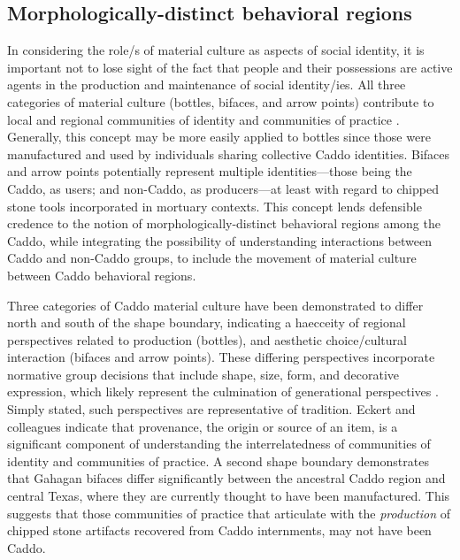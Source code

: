 \documentclass[smallextended]{svjour3}       %
\begin{document}
\hypertarget{morphologically-distinct-behavioral-regions}{%
\subsection{Morphologically-distinct behavioral
regions}\label{morphologically-distinct-behavioral-regions}}

In considering the role/s of material culture as aspects of social
identity, it is important not to lose sight of the fact that people and
their possessions are active agents in the production and maintenance of
social identity/ies. All three categories of material culture (bottles,
bifaces, and arrow points) contribute to local and regional communities
of identity and communities of practice \cite{RN8061}. Generally, this
concept may be more easily applied to bottles since those were
manufactured and used by individuals sharing collective Caddo
identities. Bifaces and arrow points potentially represent multiple
identities---those being the Caddo, as users; and non-Caddo, as
producers---at least with regard to chipped stone tools incorporated in
mortuary contexts. This concept lends defensible credence to the notion
of morphologically-distinct behavioral regions among the Caddo, while
integrating the possibility of understanding interactions between Caddo
and non-Caddo groups, to include the movement of material culture
between Caddo behavioral regions.

Three categories of Caddo material culture have been demonstrated to
differ north and south of the shape boundary, indicating a haecceity of
regional perspectives related to production (bottles), and aesthetic
choice/cultural interaction (bifaces and arrow points). These differing
perspectives incorporate normative group decisions that include shape,
size, form, and decorative expression, which likely represent the
culmination of generational perspectives \cite{RN5610}. Simply stated,
such perspectives are representative of tradition. Eckert and colleagues
\cite{RN8061} indicate that provenance, the origin or source of an item,
is a significant component of understanding the interrelatedness of
communities of identity and communities of practice. A second shape
boundary demonstrates that Gahagan bifaces differ significantly between
the ancestral Caddo region and central Texas, where they are currently
thought to have been manufactured. This suggests that those communities
of practice that articulate with the \emph{production} of chipped stone
artifacts recovered from Caddo internments, may not have been Caddo.
\end{document}

